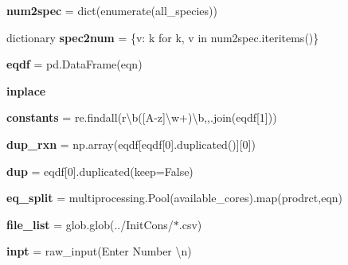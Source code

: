 \begin{DoxyCompactItemize}
{\bfseries num2spec} = dict(enumerate(all\+\_\+species))
\item 
\mbox{\label{namespaceMCM__subset__new_a5983dc07fd65cfa1d3ace370960ab04b}} 
dictionary {\bfseries spec2num} = \{v\+: k for k, v in num2spec.\+iteritems()\}
\item 
\mbox{\label{namespaceMCM__subset__new_a93078aa484a892cee2f789d84a600fda}} 
{\bfseries eqdf} = pd.\+Data\+Frame(eqn)
\item 
\mbox{\label{namespaceMCM__subset__new_ab3d9ec74a6444d9e385d068be1afc74c}} 
{\bfseries inplace}
\item 
\mbox{\label{namespaceMCM__subset__new_aba2912605a91e99c4e539f94b8959022}} 
{\bfseries constants} = re.\+findall(r\textquotesingle{}\textbackslash{}b(\mbox{[}A-\/z\mbox{]}\textbackslash{}w+)\textbackslash{}b\textquotesingle{},\textquotesingle{},\textquotesingle{}.join(eqdf\mbox{[}1\mbox{]}))
\item 
\mbox{\label{namespaceMCM__subset__new_a90a48a8a576c90add5893c8df63c02f8}} 
{\bfseries dup\+\_\+rxn} = np.\+array(eqdf\mbox{[}eqdf\mbox{[}0\mbox{]}.duplicated()\mbox{]}\mbox{[}0\mbox{]})
\item 
\mbox{\label{namespaceMCM__subset__new_a1bd395a9abd5caba363da092ce002085}} 
{\bfseries dup} = eqdf\mbox{[}0\mbox{]}.duplicated(keep=False)
\item 
\mbox{\label{namespaceMCM__subset__new_a96484ef91569a9d3b176c82aef2473e6}} 
{\bfseries eq\+\_\+split} = multiprocessing.\+Pool(available\+\_\+cores).map(prodrct,eqn)
\item 
\mbox{\label{namespaceMCM__subset__new_aa21bae84ab4e878ba8d38350797e571d}} 
{\bfseries file\+\_\+list} = glob.\+glob(\textquotesingle{}../Init\+Cons/$\ast$.csv\textquotesingle{})
\item 
\mbox{\label{namespaceMCM__subset__new_a25f2f9fb9b219cc2bea6061d76795a9b}} 
{\bfseries inpt} = raw\+\_\+input(\textquotesingle{}Enter Number \textbackslash{}n\textquotesingle{})

\end{DoxyCompactItemize}
